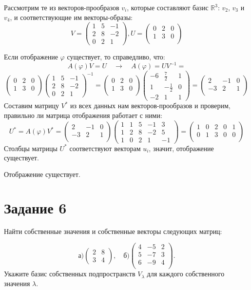 \documentclass[a4paper,12pt]{article}
\newcommand{\ssolve}{\par\vspace{5pt}\noindent{\bf Решение. }\par}
\newcommand{\aanswer}{\par\vspace{5pt}\noindent{\bf Ответ. }}
\newcommand{\bpm}{\begin{pmatrix}}
\newcommand{\epm}{\end{pmatrix}}
\begin{document}
\ssolve
Рассмотрим те из векторов-прообразов $v_i$, которые составляют базис $\mathbb{R}^3$: $v_2$, $v_3$ и $v_4$, и соответствующие им векторы-образы:
$$V=
\bpm
1&5&-1\\
2&8&-2\\
0&2&1
\epm, 
 U=
\bpm
0&2&0\\
1&3&0\\
\epm
$$

Если отображение $\varphi$ существует, то справедливо, что:
$$A(\varphi)V=U 
\quad \longrightarrow \quad
A(\varphi)= UV^{-1}=$$
$$
\bpm
0&2&0\\
1&3&0\\
\epm
\bpm
1&5&-1\\
2&8&-2\\
0&2&1
\epm^{-1}
=
\bpm
0&2&0\\
1&3&0\\
\epm
\bpm
-6&\frac{7}{2}&1\\
1&-\frac{1}{2}&0\\
-2&1&1
\epm=
\bpm
2&-1&0\\
-3&2&1\\
\epm
$$
Составим матрицу $V^*$ из всех данных нам векторов-прообразов и проверим, правильно ли матрица отображения работает с ними:
$$
U^*=A(\varphi)V^*=
\bpm
2&-1&0\\
-3&2&1\\
\epm
\bpm
1&1&5&-1&3\\
1&2&8&-2&5\\
1&0&2&1&-1
\epm
=
\bpm
1&0&2&0&1\\
0&1&3&0&0\\
\epm
$$
Столбцы матрицы $U^*$ соответствуют векторам $u_i$, значит, отображение существует.
\aanswer
Отображение существует.
\newpage

\section*{Задание 6}
Найти собственные значения и собственные векторы следующих матриц:

$$
\text{а)}  \begin{pmatrix}
2 & 8\\
3 & 4
\end{pmatrix}, \quad
\text{б)} \begin{pmatrix}
{4}&{-5}&{2}\\
{5}&{-7}&{3}\\
{6}&{-9}&{4}\\
\end{pmatrix}.
$$
Укажите базис собственных подпространств $V_\lambda$ для каждого собственного значения $\lambda$.
\end{document}
